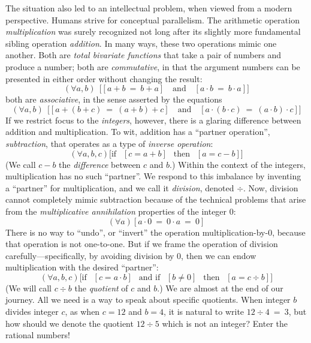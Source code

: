 The situation also led to an intellectual problem, when viewed from a
modern perspective.  Humans strive for conceptual parallelism.  The
arithmetic operation {\it multiplication} was surely recognized not
long after its slightly more fundamental sibling operation {\it
  addition}.  In many ways, these two operations mimic one another.
Both are {\em total bivariate functions} that take a pair of numbers
and produce a number; both are {\em commutative}, in that the argument
numbers can be presented in either order without changing the result:
\[ (\forall a,b) \ \ \big[ [a+b \ = \ b+a]
 \ \ \ \mbox{ and } \ \ \
[a \cdot b \ = \ b \cdot a] \big]
\]
both are {\em associative}, in the sense asserted by the equations
\[
(\forall a,b) \ \ \big[ [a+(b+c) \ = \ (a+b)+c]
 \ \ \ \mbox{ and } \ \ \ 
[a \cdot (b \cdot c) \ = \ (a \cdot b) \cdot c] \big]
\]
If we restrict focus to the {\em integers}, however, there is a
glaring difference between addition and multiplication.  To wit,
addition has a ``partner operation'', {\it subtraction}, that operates
as a type of {\it inverse operation}:
\[ (\forall a, b, c) \big[ \mbox{if } \ \ [c = a + b] \ \ \mbox{ then }
  \ \ [a = c-b] \big]
\]
(We call $c-b$ the {\em difference} between $c$ and $b$.)  Within the
context of the integers, multiplication has no such ``partner''.  We
respond to this imbalance by inventing a ``partner'' for
multiplication, and we call it {\it division}, denoted $\div$.  Now,
division cannot completely mimic subtraction because of the technical
problems that arise from the {\em multiplicative annihilation}
\index{$0$: the multiplicative annihilator} properties of the integer
$0$:
\[ (\forall a) \left[ a \cdot 0 \ = \ 0 \cdot a \ = \ 0 \right] \] 
There is no way to ``undo'', or ``invert'' the operation
multiplication-by-$0$, because that operation is not one-to-one.  But
if we frame the operation of division carefully---specifically, by
avoiding division by $0$, then we can endow multiplication with the
desired ``partner'':
\[ (\forall a, b, c) \big[ \mbox{if } \ \ [c = a \cdot b] \ \
\mbox{ and if } \ \ [b \neq 0] \ \
 \mbox{ then }
  \ \ [a = c \div b] \big]
\]
(We will call $c \div b$ the {\em quotient} of $c$ and $b$.)
 We are almost at the end of our journey.  All we need
is a way to speak about specific quotients.  When integer $b$ divides
integer $c$, as when $c = 12$ and $b = 4$, it is natural to write $12
\div 4 \ = \ 3$, but how should we denote the quotient $12 \div 5$
which is not an integer?  Enter the rational numbers!


